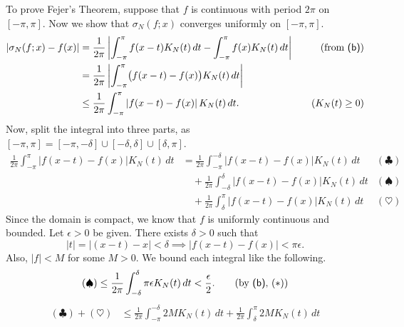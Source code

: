 \documentclass[12pt]{report}
\newcommand{\abs}[1]{\left| #1 \right|}
\newcommand{\mast}{\(\ast\)}
\renewcommand{\d}[1]{\,d{#1}}
\begin{document}
\begin{enumerate}
    To prove Fejer's Theorem, suppose that \(f\) is continuous with period \(2\pi\) on \([-\pi, \pi]\). Now we show that \(\sigma_N(f;x)\) converges uniformly on \([-\pi, \pi]\).
    \[
        \begin{aligned}
            \abs{\sigma_N(f; x) - f(x)} & = \frac{1}{2\pi}\abs{\int_{-\pi}^\pi f(x-t) K_N(t)\d{t} - \int_{-\pi}^\pi f(x) K_N(t)\d{t}} \quad & (\text{from {\sffamily (b)}}) \\
                                        & =\frac{1}{2\pi}\abs{\int_{-\pi}^\pi \bigl( f(x-t) - f(x) \bigr) K_N(t) \d{t}}                                                     \\
                                        & \leq \frac{1}{2\pi} \int_{-\pi}^\pi \abs{f(x-t) - f(x)} K_N(t) \d{t}. \quad                       & (K_N(t) \geq 0)
        \end{aligned}
    \]
    Now, split the integral into three parts, as \([-\pi, \pi] = [-\pi, -\delta] \cup [-\delta, \delta] \cup [\delta, \pi]\).
    \[
        \begin{aligned}
            \frac{1}{2\pi} \int_{-\pi}^\pi \abs{f(x-t) - f(x)} K_N(t) \d{t} & = \frac{1}{2\pi} \int_{-\pi}^{-\delta} \abs{f(x-t) - f(x)} K_N(t) \d{t}       & (\clubsuit)  \\
                                                                            & \quad + \frac{1}{2\pi} \int_{-\delta}^\delta \abs{f(x-t) - f(x)} K_N(t) \d{t} & (\spadesuit) \\
                                                                            & \quad + \frac{1}{2\pi} \int_{\delta}^\pi \abs{f(x-t) - f(x)} K_N(t) \d{t}     & (\heartsuit)
        \end{aligned}
    \]
    Since the domain is compact, we know that \(f\) is uniformly continuous and bounded. Let \(\epsilon > 0\) be given. There exists \(\delta > 0\) such that
    \[ \tag{\mast}
        \abs{t} = \abs{(x - t) - x} < \delta \implies \abs{f(x-t) - f(x)} < \pi\epsilon.
    \]
    Also, \(\abs{f} < M\) for some \(M > 0\). We bound each integral like the following.
    \[
        (\spadesuit) \leq \frac{1}{2\pi} \int_{-\delta}^\delta \pi\epsilon K_N(t) \d{t} < \frac{\epsilon}{2}. \qquad (\text{by {\sffamily (b)}, (\mast)})
    \]
    \[
        \begin{aligned}
            (\clubsuit) + (\heartsuit) & \leq \frac{1}{2\pi} \int_{-\pi}^{-\delta} 2M K_N(t) \d{t} + \frac{1}{2\pi} \int_{\delta}^\pi 2M K_N(t) \d{t}                                                                                                      \\

\end{aligned}\]
\end{enumerate}
\end{document}
